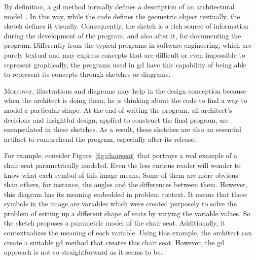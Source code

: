 By definition, a \gls{gd} method formally defines a description of an architectural model~\citep{mccormack2004generative}. In this way, while the code defines the geometric object textually, the sketch defines it visually. Consequently, the sketch is a rich source of information during the development of the program, and also after it, for documenting the program. Differently from the typical programs in software engineering, which are purely textual and may express concepts that are difficult or even impossible to represent graphically, the programs used in \gls{gd} have this capability of being able to represent its concepts through sketches or diagrams.

Moreover, illustrations and diagrams may help in the design conception because when the architect is doing them, he is thinking about the code to find a way to model a particular shape. At the end of writing the program, all architect's decisions and insightful design, applied to construct the final program, are encapsulated in these sketches. As a result, these sketches are also an essential artifact to comprehend the program, especially after its release. 

For example, consider Figure~\ref{fig:chairseat} that portrays a real example of a chair seat parametrically modeled. Even the less curious reader will wonder to know what each symbol of this image means. Some of them are more obvious than others, for instance, the angles and the differences between them. However, this diagram has its meaning embedded in problem context. It means that those symbols in the image are variables which were created purposely to solve the problem of setting up a different shape of seats by varying the variable values. So the sketch proposes a parametric model of the chair seat. Additionally, it contextualizes the meaning of each variable. Using this example, the architect can create a suitable \gls{gd} method that creates this chair seat. However, the \gls{gd} approach is not so straightforward as it seems to be. 

